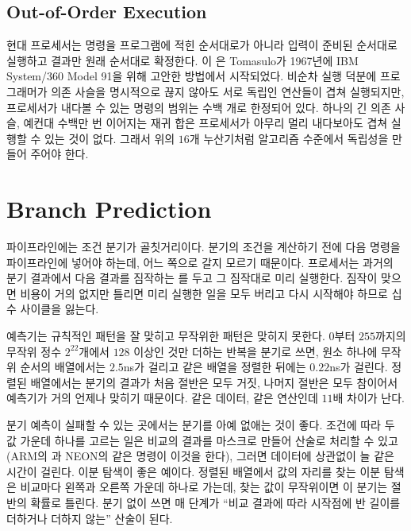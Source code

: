 \subsection{Out-of-Order Execution}

현대 프로세서는 명령을 프로그램에 적힌 순서대로가 아니라 입력이 준비된 순서대로 실행하고 결과만 원래 순서대로 확정한다. 이 은 Tomasulo가 1967년에 IBM System/360 Model 91을 위해 고안한 방법에서 시작되었다\cite{tomasulo1967}. 비순차 실행 덕분에 프로그래머가 의존 사슬을 명시적으로 끊지 않아도 서로 독립인 연산들이 겹쳐 실행되지만, 프로세서가 내다볼 수 있는 명령의 범위는 수백 개로 한정되어 있다. 하나의 긴 의존 사슬, 예컨대 수백만 번 이어지는 재귀 합은 프로세서가 아무리 멀리 내다보아도 겹쳐 실행할 수 있는 것이 없다. 그래서 위의 $16$개 누산기처럼 알고리즘 수준에서 독립성을 만들어 주어야 한다.

\section{Branch Prediction}
\label{sec:branch-prediction}

파이프라인에는 조건 분기가 골칫거리이다. 분기의 조건을 계산하기 전에 다음 명령을 파이프라인에 넣어야 하는데, 어느 쪽으로 갈지 모르기 때문이다. 프로세서는 과거의 분기 결과에서 다음 결과를 짐작하는 를 두고 그 짐작대로 미리 실행한다\cite{smith1981branch}. 짐작이 맞으면 비용이 거의 없지만 틀리면 미리 실행한 일을 모두 버리고 다시 시작해야 하므로 십수 사이클을 잃는다.

예측기는 규칙적인 패턴을 잘 맞히고 무작위한 패턴은 맞히지 못한다. $0$부터 $255$까지의 무작위 정수 $2^{22}$개에서 $128$ 이상인 것만 더하는 반복을 분기로 쓰면, 원소 하나에 무작위 순서의 배열에서는 $2.5$ns가 걸리고 같은 배열을 정렬한 뒤에는 $0.22$ns가 걸린다. 정렬된 배열에서는 분기의 결과가 처음 절반은 모두 거짓, 나머지 절반은 모두 참이어서 예측기가 거의 언제나 맞히기 때문이다. 같은 데이터, 같은 연산인데 $11$배 차이가 난다.

분기 예측이 실패할 수 있는 곳에서는 분기를 아예 없애는 것이 좋다. 조건에 따라 두 값 가운데 하나를 고르는 일은 비교의 결과를 마스크로 만들어 산술로 처리할 수 있고(ARM의 과 NEON의  같은 명령이 이것을 한다), 그러면 데이터에 상관없이 늘 같은 시간이 걸린다. 이분 탐색이 좋은 예이다. 정렬된 배열에서 값의 자리를 찾는 이분 탐색은 비교마다 왼쪽과 오른쪽 가운데 하나로 가는데, 찾는 값이 무작위이면 이 분기는 절반의 확률로 틀린다. 분기 없이 쓰면 매 단계가 ``비교 결과에 따라 시작점에 반 길이를 더하거나 더하지 않는'' 산술이 된다.

